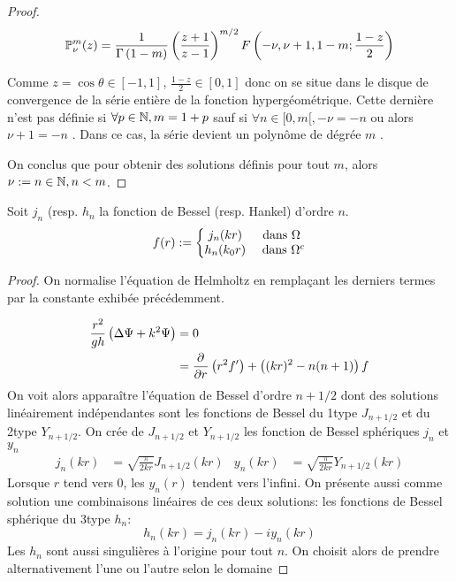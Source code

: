 \begin{proof}
{\[
\mathbb{P}^m_\nu(z) = \dfrac{1}{\Gamma\left(1-m\right)}\left(\dfrac{z+1}{z-1}\right)^{m/2}F\left(-\nu,\nu+1,1-m;\dfrac{1-z}{2}\right)
\]

Comme \(z=\cos\theta \in [-1,1] \), \(\frac{1-z}{2} \in [0,1]\) donc on se situe dans le disque de convergence de la série entière de la fonction hypergéométrique. Cette dernière n'est pas définie si \(\forall p\in \mathbb N, m=1+p \) sauf si \(\forall n \in [0,m[, -\nu = -n \) ou alors \( \nu +1 = -n \) \cite[p.~556]{abramowitz_handbook_1964}. Dans ce cas, la série devient un polynôme de dégrée \(m\) \cite[p.~561]{abramowitz_handbook_1964}.

On conclus que pour obtenir des solutions définis pour tout \(m\), alors \(\nu:=n \in \mathbb N, n< m \).
}


\end{proof}


\begin{prop} Soit \(j_n\) (resp. \(h_n\) la fonction de Bessel (resp. Hankel) d'ordre \(n\).
  \begin{equation}
    f(r) := \left\lbrace
    \begin{matrix}
    j_n(kr) & \text{ dans \(\Omega\) } \\
    h_n(k_0r) & \text{ dans } \Omega^c \\
    \end{matrix}\right.
  \end{equation}
\end{prop}
\begin{proof}
On normalise l'équation de Helmholtz en remplaçant les derniers termes par la constante exhibée précédemment.

\begin{align*}
\dfrac{r^2}{gh} \left(\Delta \Psi + k^2 \Psi\right) &= 0 \\
&= \dfrac{\partial^{{}} }{{\partial r}^{{}}}\left(r^2f'\right) + \left((kr)^2 - n(n+1)\right)f
\end{align*}
  On voit alors apparaître l'équation de Bessel d'ordre \(n +1/2\) dont des solutions linéairement indépendantes sont les fonctions de Bessel du 1\ier type \(J_{n+1/2}\) et du 2\ieme type \(Y_{n+1/2}\)\cite[p.~86]{bohren_absorption_2004}\cite[p.~1465]{morse_methods_1953}.
  On crée de \(J_{n+1/2}\) et \(Y_{n+1/2}\) les fonction de Bessel sphériques \(j_n\) et \(y_n\)
  \begin{align*}
  j_n(kr) &= \sqrt{\frac{\pi}{2kr}}J_{n+1/2}(kr) &
  y_n(kr) &= \sqrt{\frac{\pi}{2kr}}Y_{n+1/2}(kr)
  \end{align*}
  Lorsque \(r\) tend vers \(0\), les \(y_n(r)\) tendent vers l'infini. On présente aussi comme solution une combinaisons linéaires de ces deux solutions: les fonctions de Bessel sphérique du 3\ieme type \(h_n\):
  \[
  h_n(kr)=j_n(kr)-i y_n(kr)
  \]
  Les \(h_n\) sont aussi singulières à l'origine pour tout \(n\). On choisit alors de prendre alternativement l'une ou l'autre selon le domaine
  \end{proof}


